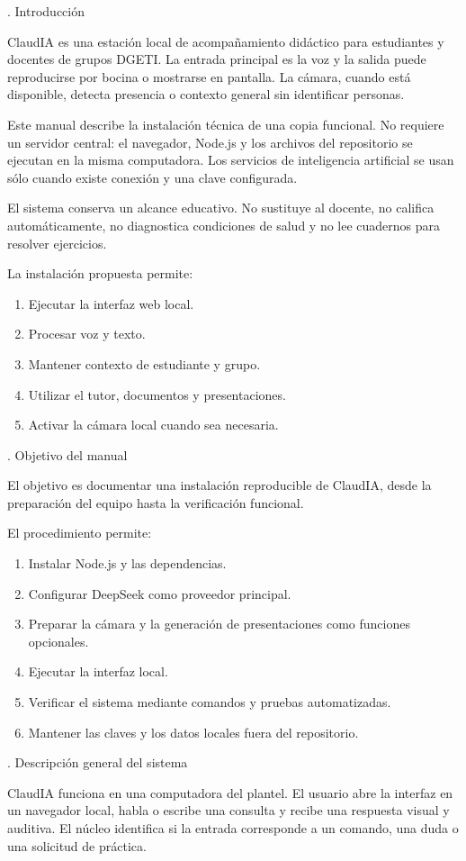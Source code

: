 \documentclass[11pt]{article}
\newcommand{\SectionNum}[2]{%
  \par\phantomsection\label{sec:#1}%
  {\normalfont\fontsize{14}{17}\selectfont #1. #2\par}%
  \vspace{7pt}%
}
\begin{document}
\clearpage
\SectionNum{1}{Introducción}
ClaudIA es una estación local de acompañamiento didáctico para estudiantes y docentes de grupos DGETI. La entrada principal es la voz y la salida puede reproducirse por bocina o mostrarse en pantalla. La cámara, cuando está disponible, detecta presencia o contexto general sin identificar personas.

Este manual describe la instalación técnica de una copia funcional. No requiere un servidor central: el navegador, Node.js y los archivos del repositorio se ejecutan en la misma computadora. Los servicios de inteligencia artificial se usan sólo cuando existe conexión y una clave configurada.

El sistema conserva un alcance educativo. No sustituye al docente, no califica automáticamente, no diagnostica condiciones de salud y no lee cuadernos para resolver ejercicios.

La instalación propuesta permite:
\begin{enumerate}
  \item Ejecutar la interfaz web local.
  \item Procesar voz y texto.
  \item Mantener contexto de estudiante y grupo.
  \item Utilizar el tutor, documentos y presentaciones.
  \item Activar la cámara local cuando sea necesaria.
\end{enumerate}

\clearpage
\SectionNum{2}{Objetivo del manual}
El objetivo es documentar una instalación reproducible de ClaudIA, desde la preparación del equipo hasta la verificación funcional.

El procedimiento permite:
\begin{enumerate}
  \item Instalar Node.js y las dependencias.
  \item Configurar DeepSeek como proveedor principal.
  \item Preparar la cámara y la generación de presentaciones como funciones opcionales.
  \item Ejecutar la interfaz local.
  \item Verificar el sistema mediante comandos y pruebas automatizadas.
  \item Mantener las claves y los datos locales fuera del repositorio.
\end{enumerate}

\SectionNum{3}{Descripción general del sistema}
ClaudIA funciona en una computadora del plantel. El usuario abre la interfaz en un navegador local, habla o escribe una consulta y recibe una respuesta visual y auditiva. El núcleo identifica si la entrada corresponde a un comando, una duda o una solicitud de práctica.
\end{document}
